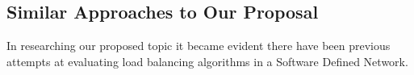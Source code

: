 


\subsection{Similar Approaches to Our Proposal}
In researching our proposed topic it became evident there have been previous attempts at evaluating load balancing algorithms in a Software Defined Network.


